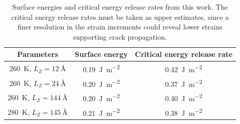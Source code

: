 \begin{table}
\centering
\caption{Surface energies and critical energy release rates from this work. The critical energy release rates must be taken as upper estimates, since a finer resolution in the strain increments could reveal lower strains supporting crack propagation.}
\label{tbl:fracture_surface}
\begin{tabular}{c|c|c}
Parameters & Surface energy & Critical energy release rate \\
\hline
\SI{260}{\kelvin}, $L_Z = \SI{12}{\angstrom}$ &\SI{0.19}{\joule\per\meter\squared} & \SI{0.42}{\joule\per\meter\squared} \\
\SI{260}{\kelvin}, $L_Z = \SI{24}{\angstrom}$ &\SI{0.20}{\joule\per\meter\squared} & \SI{0.37}{\joule\per\meter\squared} \\
\SI{260}{\kelvin}, $L_Z = \SI{144}{\angstrom}$ & \SI{0.20}{\joule\per\meter\squared} & \SI{0.40}{\joule\per\meter\squared}\\
\SI{280}{\kelvin}, $L_Z = \SI{145}{\angstrom}$ & \SI{0.21}{\joule\per\meter\squared} & \SI{0.38}{\joule\per\meter\squared}
\end{tabular}
\end{table}

